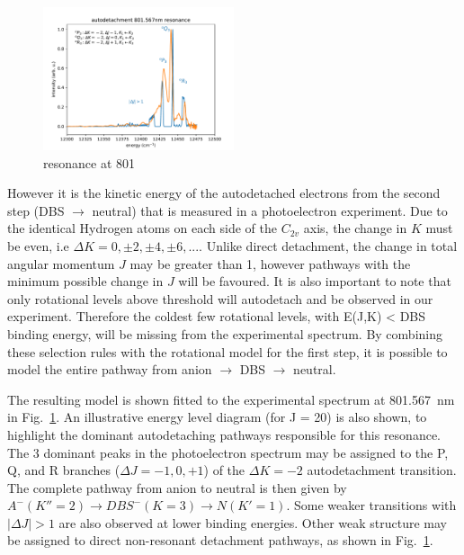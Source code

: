 \documentclass[journal=jpcafh,manuscript=article,layout=onecolumn, 12pt]{achemso}
\begin{document}
\begin{figure}
	\includegraphics[width=0.5\textwidth]{scripts/801}
	\caption{resonance at 801}
	\label{fig:801}
\end{figure}

However it is the kinetic energy of the autodetached electrons from the second step (DBS $\rightarrow$ neutral) that is measured in a photoelectron experiment. Due to the identical Hydrogen atoms on each side of the $C_{2v}$ axis, the change in $K$ must be even, i.e $\Delta K = 0, \pm2, \pm4, \pm6,... $. Unlike direct detachment, the change in total angular momentum $J$ may be greater than 1, however pathways with the minimum possible change in $J$ will be favoured. It is also important to note that only rotational levels above threshold will autodetach and be observed in our experiment. Therefore the coldest few rotational levels, with E(J,K) < DBS binding energy, will be missing from the experimental spectrum. By combining these selection rules with the rotational model for the first step, it is possible to model the entire pathway from anion $\rightarrow$ DBS $\rightarrow$ neutral. 

The resulting model is shown fitted to the experimental spectrum at 801.567~nm in Fig.~\ref{fig:801}. An illustrative energy level diagram (for J = 20) is also shown, to highlight the dominant autodetaching pathways responsible for this resonance. The 3 dominant peaks in the photoelectron spectrum may be assigned to the P, Q, and R branches ($\Delta J = -1, 0 ,+1$) of the $\Delta K = -2$ autodetachment transition. The complete pathway from anion to neutral is then given by $A^-(K''=2)\rightarrow DBS^-(K=3) \rightarrow N(K'=1)$. Some weaker transitions with $|\Delta J| > 1$ are also observed at lower binding energies. Other weak structure may be assigned to direct non-resonant detachment pathways, as shown in Fig.~\ref{fig:801}.
\end{document}
